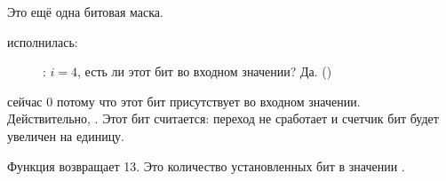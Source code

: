 Это ещё одна битовая маска.

\clearpage
\AND исполнилась:

\begin{figure}[H]
\centering
{}
\caption{\olly: $i=4$, есть ли этот бит во входном значении? Да.  ()}
\label{fig:shifts_olly4_3}
\end{figure}

\ZF сейчас 0 потому что этот бит присутствует во входном значении.\\
Действительно, . 
Этот бит считается: переход не сработает и счетчик бит будет увеличен на единицу.

Функция возвращает 13. 
Это количество установленных бит в значении .
